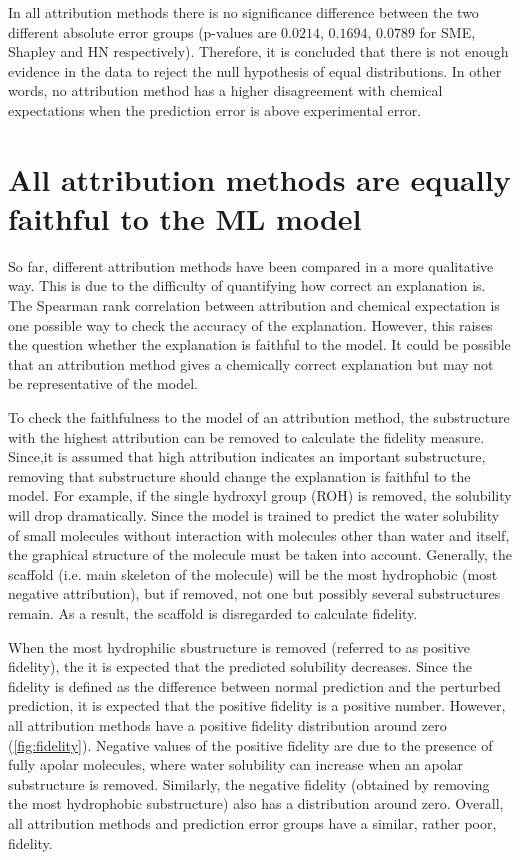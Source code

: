 In all attribution methods there is no significance difference between the two different
absolute error groups (p-values are $0.0214$, $0.1694$, $0.0789$ for SME, Shapley and
HN respectively). Therefore, it is concluded that there is not enough evidence in the
data to reject the null hypothesis of equal distributions. In other words, no attribution 
method has a higher disagreement with chemical expectations when the prediction error 
is above experimental error.


\section{All attribution methods are equally faithful to the ML model}


So far, different attribution methods have been compared in a more qualitative way. 
This is due to the difficulty of quantifying how correct an explanation is. The 
Spearman rank correlation between attribution and chemical expectation is one 
possible way to check the accuracy of the explanation. However, this raises the 
question whether the explanation is faithful to the model. It could be possible 
that an attribution method gives a chemically correct explanation but may not be 
representative of the model. 


To check the faithfulness to the model of an attribution method, the substructure 
with the highest attribution can be removed to calculate the fidelity measure. 
Since,it is assumed that high attribution indicates an important substructure, 
removing that substructure should change the explanation is faithful to the model. 
For example, if the single hydroxyl group (ROH) is removed, the solubility will 
drop dramatically. Since the model is trained to predict the water solubility of 
small molecules without interaction with molecules other than water and itself, 
the graphical structure of the molecule must be taken into account. Generally, 
the scaffold (i.e. main skeleton of the molecule) will be the most hydrophobic 
(most negative attribution), but if removed, not one but possibly several substructures 
remain. As a result, the scaffold is disregarded to calculate fidelity.


When the most hydrophilic sbustructure is removed (referred to as positive fidelity), 
the it is expected that the predicted solubility decreases. Since the fidelity is 
defined as the difference between normal prediction and the perturbed prediction, it
is expected that the positive fidelity is a positive number. However, all attribution 
methods have a positive fidelity distribution around zero (\cref{fig:fidelity}). Negative
values of the positive fidelity are due to the presence of fully apolar molecules, where 
water solubility can increase when an apolar substructure is removed. Similarly, the negative 
fidelity (obtained by removing the most hydrophobic substructure) also has a distribution 
around zero. Overall, all attribution methods and prediction error groups have a similar, 
rather poor, fidelity.


